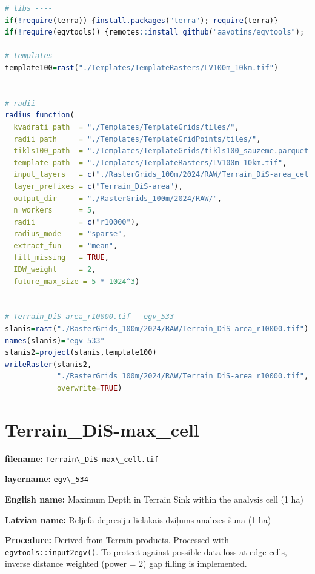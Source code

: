 \documentclass[
]{book}
\newcommand{\passthrough}[1]{#1}
\begin{document}
\begin{lstlisting}[language=R]
# libs ----
if(!require(terra)) {install.packages("terra"); require(terra)}
if(!require(egvtools)) {remotes::install_github("aavotins/egvtools"); require(egvtools)}

# templates ----
template100=rast("./Templates/TemplateRasters/LV100m_10km.tif")


# radii
radius_function(
  kvadrati_path  = "./Templates/TemplateGrids/tiles/",
  radii_path     = "./Templates/TemplateGridPoints/tiles/",
  tikls100_path  = "./Templates/TemplateGrids/tikls100_sauzeme.parquet",
  template_path  = "./Templates/TemplateRasters/LV100m_10km.tif",
  input_layers   = c("./RasterGrids_100m/2024/RAW/Terrain_DiS-area_cell.tif"),
  layer_prefixes = c("Terrain_DiS-area"),
  output_dir     = "./RasterGrids_100m/2024/RAW/",
  n_workers      = 5,
  radii          = c("r10000"),
  radius_mode    = "sparse",
  extract_fun    = "mean",
  fill_missing   = TRUE,
  IDW_weight     = 2,
  future_max_size = 5 * 1024^3)


# Terrain_DiS-area_r10000.tif   egv_533
slanis=rast("./RasterGrids_100m/2024/RAW/Terrain_DiS-area_r10000.tif")
names(slanis)="egv_533"
slanis2=project(slanis,template100)
writeRaster(slanis2,
            "./RasterGrids_100m/2024/RAW/Terrain_DiS-area_r10000.tif",
            overwrite=TRUE)
\end{lstlisting}

\section{Terrain\_DiS-max\_cell}\label{ch06.534}

\textbf{filename:} \passthrough{\lstinline!Terrain\_DiS-max\_cell.tif!}

\textbf{layername:} \passthrough{\lstinline!egv\_534!}

\textbf{English name:} Maximum Depth in Terrain Sink within the analysis cell (1 ha)

\textbf{Latvian name:} Reljefa depresiju lielākais dziļums analīzes šūnā (1 ha)

\textbf{Procedure:} Derived from \hyperref[Ch05.01]{Terrain products}. Processed
with \passthrough{\lstinline!egvtools::input2egv()!}. To protect against
possible data loss at edge cells, inverse distance weighted (power = 2) gap filling
is implemented.
\end{document}
